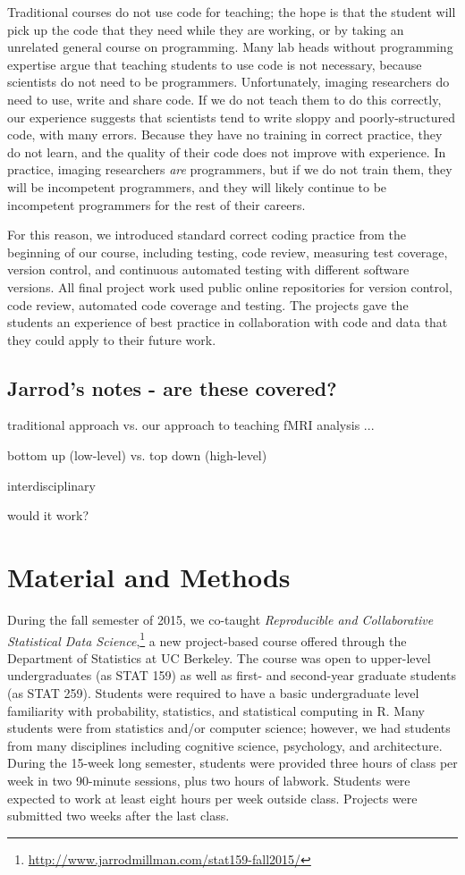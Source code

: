 Traditional courses do not use code for teaching; the hope is that the student
will pick up the code that they need while they are working, or by taking an
unrelated general course on programming.  Many lab heads without programming
expertise argue that teaching students to use code is not necessary, because
scientists do not need to be programmers.  Unfortunately, imaging researchers
do need to use, write and share code.  If we do not teach them to do this
correctly, our experience suggests that scientists tend to write sloppy and
poorly-structured code, with many errors.  Because they have no training in
correct practice, they do not learn, and the quality of their code does not
improve with experience.  In practice, imaging researchers {\em are}
programmers, but if we do not train them, they will be incompetent
programmers, and they will likely continue to be incompetent programmers for
the rest of their careers.

For this reason, we introduced standard correct coding practice from the
beginning of our course, including testing, code review, measuring test
coverage, version control, and continuous automated testing with different
software versions. All final project work used public online repositories for
version control, code review, automated code coverage and testing.  The
projects gave the students an experience of best practice in collaboration
with code and data that they could apply to their future work.

\subsection{Jarrod's notes - are these covered?}

traditional approach vs. our approach to teaching fMRI analysis ...

bottom up (low-level) vs. top down (high-level)

interdisciplinary

would it work?

\section{Material and Methods}

During the fall semester of 2015, we co-taught \emph{Reproducible and Collaborative
Statistical Data Science},\footnote{\url{http://www.jarrodmillman.com/stat159-fall2015/}}
a new project-based course offered through the Department of Statistics at UC Berkeley.
The course was open to upper-level undergraduates (as STAT 159) as well as
first- and second-year graduate students (as STAT 259).
Students were required to have a basic undergraduate level familiarity with
probability, statistics, and statistical computing in R.
Many students were from statistics and/or computer science; however, we had
students from many disciplines including cognitive science, psychology, and
architecture.
During the 15-week long semester, students were provided three hours of class
per week in two 90-minute sessions, plus two hours of labwork.
Students were expected to work at least eight hours per week outside class.
Projects were submitted two weeks after the last class.

